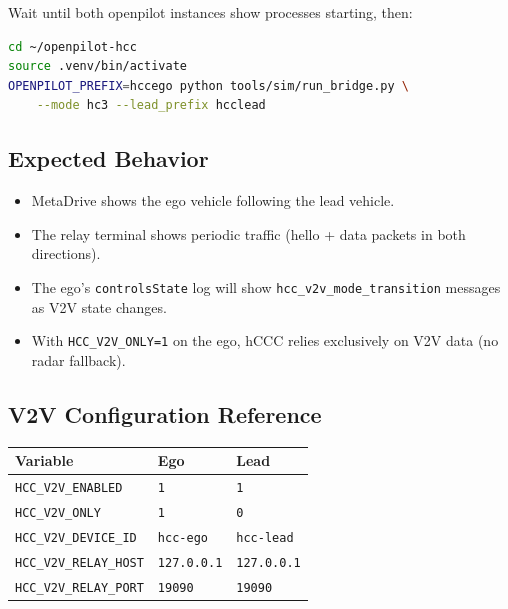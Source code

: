 \documentclass[11pt, letterpaper]{article}
\begin{document}
Wait until both openpilot instances show processes starting, then:

\begin{lstlisting}[language=bash]
cd ~/openpilot-hcc
source .venv/bin/activate
OPENPILOT_PREFIX=hccego python tools/sim/run_bridge.py \
    --mode hc3 --lead_prefix hcclead
\end{lstlisting}

\subsection{Expected Behavior}

\begin{itemize}
  \item MetaDrive shows the ego vehicle following the lead vehicle.
  \item The relay terminal shows periodic traffic (hello + data packets
        in both directions).
  \item The ego's \texttt{controlsState} log will show
        \texttt{hcc\_v2v\_mode\_transition} messages as V2V state
        changes.
  \item With \texttt{HCC\_V2V\_ONLY=1} on the ego, hCCC relies
        exclusively on V2V data (no radar fallback).
\end{itemize}

\subsection{V2V Configuration Reference}

\begin{center}
\begin{tabular}{@{}lll@{}}
\toprule
\textbf{Variable} & \textbf{Ego} & \textbf{Lead} \\
\midrule
\texttt{HCC\_V2V\_ENABLED}    & \texttt{1} & \texttt{1} \\
\texttt{HCC\_V2V\_ONLY}       & \texttt{1} & \texttt{0} \\
\texttt{HCC\_V2V\_DEVICE\_ID} & \texttt{hcc-ego} & \texttt{hcc-lead} \\
\texttt{HCC\_V2V\_RELAY\_HOST}& \texttt{127.0.0.1} & \texttt{127.0.0.1} \\
\texttt{HCC\_V2V\_RELAY\_PORT}& \texttt{19090} & \texttt{19090} \\
\bottomrule
\end{tabular}
\end{center}


\end{document}
